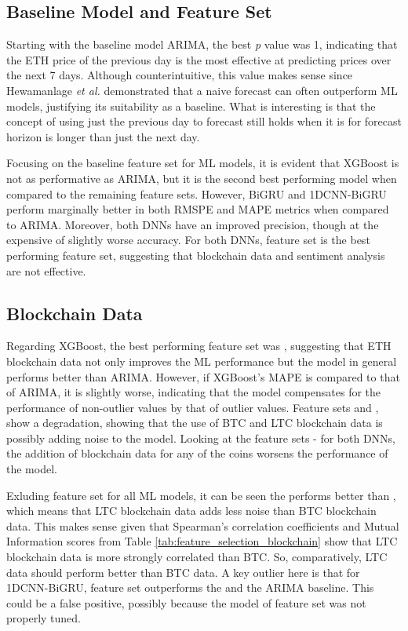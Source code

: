 \documentclass[ %
                    author={Raj Dhakan},
                supervisor={Dr. Ayush Joshi},
                    degree={MSc},
                     title={Ethereum Price Prediction using Internal and External Factors},
                  subtitle={},
                      type={},
                      year={2025}]{dissertation}
\begin{document}
\subsection{Baseline Model and Feature Set}

Starting with the baseline model ARIMA, the best \textit{p} value was 1, indicating that the ETH price of the previous day is the most effective at predicting prices over the next 7 days. Although counterintuitive, this value makes sense since Hewamanlage \textit{et al.} \cite{hewamalage2023forecast} demonstrated that a naive forecast can often outperform ML models, justifying its suitability as a baseline. What is interesting is that the concept of using just the previous day to forecast still holds when it is for forecast horizon is longer than just the next day.

Focusing on the baseline feature set  for ML models, it is evident that XGBoost is not as performative as ARIMA, but it is the second best performing model when compared to the remaining feature sets. However, BiGRU and 1DCNN-BiGRU perform marginally better in both RMSPE and MAPE metrics when compared to ARIMA. Moreover, both DNNs have an improved precision, though at the expensive of slightly worse accuracy. For both DNNs, feature set  is the best performing feature set, suggesting that blockchain data and sentiment analysis are not effective. 

\subsection{Blockchain Data}
Regarding XGBoost, the best performing feature set was , suggesting that ETH blockchain data not only improves the ML performance but the model in general performs better than ARIMA. However, if XGBoost's MAPE is compared to that of ARIMA, it is slightly worse, indicating that the model compensates for the performance of non-outlier values by that of outlier values. Feature sets  and , show a degradation, showing that the use of BTC and LTC blockchain data is possibly adding noise to the model. Looking at the feature sets - for both DNNs, the addition of blockchain data for any of the coins worsens the performance of the model.

Exluding feature set  for all ML models, it can be seen the  performs better than , which means that LTC blockchain data adds less noise than BTC blockchain data. This makes sense given that Spearman's correlation coefficients and Mutual Information scores from Table \ref{tab:feature_selection_blockchain} show that LTC blockchain data is more strongly correlated than BTC. So, comparatively, LTC data should perform better than BTC data. A key outlier here is that for 1DCNN-BiGRU, feature set  outperforms the  and the ARIMA baseline. This could be a false positive, possibly because the model of feature set  was not properly tuned. 
\end{document}
